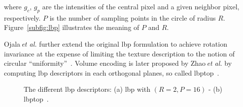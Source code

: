 \noindent where $g_c$, $g_{p}$ are the intensities of the central pixel and a given neighbor pixel, respectively. $P$ is the number of sampling points in the circle of radius $R$. Figure~\ref{subfig:lbp} illustrates the meaning of $P$ and $R$.

Ojala\,\textit{et al.} further extend the original \ac{lbp} formulation to achieve rotation invariance at the expense of limiting the texture description to the notion of circular ``uniformity''~\cite{ojala2002multiresolution}. Volume encoding is later proposed by Zhao\,\textit{et al.} by computing \ac{lbp} descriptors in each orthogonal planes, so called \ac{lbptop}~\cite{zhao2012rotation}.

\begin{figure}[t]
  \centering
  \hspace*{\fill}
   \hfill
  \hspace*{\fill}
  \caption{The different \ac{lbp} descriptors: (a) \ac{lbp} with $(R=2,P=16)$ - (b) \ac{lbptop}~\cite{zhao2012rotation}.}
  \label{fig:lbp}
\end{figure}

